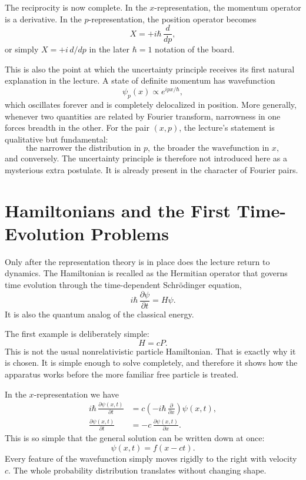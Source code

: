 The reciprocity is now complete. In the $x$-representation, the momentum operator is a derivative. In the $p$-representation, the position operator becomes
\begin{equation}
X=+i\hbar\,\frac{d}{dp},
\end{equation}
or simply $X=+i\,d/dp$ in the later $\hbar=1$ notation of the board.

This is also the point at which the uncertainty principle receives its first natural explanation in the lecture. A state of definite momentum has wavefunction
\begin{equation}
\psi_p(x)\propto e^{ipx/\hbar},
\end{equation}
which oscillates forever and is completely delocalized in position. More generally, whenever two quantities are related by Fourier transform, narrowness in one forces breadth in the other. For the pair $(x,p)$, the lecture's statement is qualitative but fundamental:
\begin{equation}
\text{the narrower the distribution in }p,\ \text{the broader the wavefunction in }x,
\end{equation}
and conversely. The uncertainty principle is therefore not introduced here as a mysterious extra postulate. It is already present in the character of Fourier pairs.

\section{Hamiltonians and the First Time-Evolution Problems}

Only after the representation theory is in place does the lecture return to dynamics. The Hamiltonian is recalled as the Hermitian operator that governs time evolution through the time-dependent Schr\"odinger equation,
\begin{equation}
i\hbar\,\frac{\partial \psi}{\partial t}=H\psi.
\end{equation}
It is also the quantum analog of the classical energy.

The first example is deliberately simple:
\begin{equation}
H=cP.
\end{equation}
This is not the usual nonrelativistic particle Hamiltonian. That is exactly why it is chosen. It is simple enough to solve completely, and therefore it shows how the apparatus works before the more familiar free particle is treated.

In the $x$-representation we have
\begin{align}
i\hbar\,\frac{\partial \psi(x,t)}{\partial t}
&=c\left(-i\hbar\,\frac{\partial}{\partial x}\right)\psi(x,t), \\
\frac{\partial \psi(x,t)}{\partial t}
&=-c\,\frac{\partial \psi(x,t)}{\partial x}.
\end{align}
This is so simple that the general solution can be written down at once:
\begin{equation}
\psi(x,t)=f(x-ct).
\end{equation}
Every feature of the wavefunction simply moves rigidly to the right with velocity $c$. The whole probability distribution translates without changing shape.

